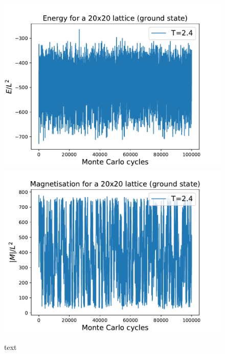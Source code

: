 \documentclass{emulateapj}
\begin{document}
\begin{figure}[H]
{{\includegraphics[scale=0.53]{EofMCC-GS-T2_4-L20-1e5.pdf}}
}\qquad
{{\includegraphics[scale=0.53]{MofMCC-GS-T2_4-L20-1e5.pdf}}
}\qquad
\caption{text}
\label{fig:GS}
\end{figure}
\end{document}
